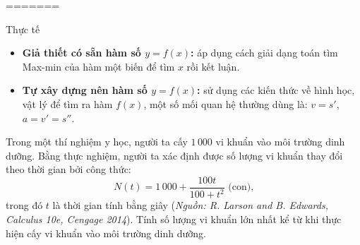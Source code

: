 =======
\begin{dang}{Thực tế}
    \begin{itemize}
        \item \textbf{Giả thiết có sẵn hàm số $y=f(x)$:} áp dụng cách giải dạng toán tìm Max-min của hàm một biến để tìm $x$ rồi kết luận.
        \item \textbf{Tự xây dựng nên hàm số $y=f(x)$:} sử dụng các kiến thức về hình học, vật lý để tìm ra hàm $f(x)$, một số mối quan hệ thường dùng là: $v=s'$, $a=v'=s''$.
    \end{itemize}
\end{dang}
\begin{vd}
    Trong một thí nghiệm y học, người ta cấy $1\,000$ vi khuẩn vào môi trường dinh dưỡng. Bằng thực nghiệm, người ta xác định được số lượng vi khuẩn thay đổi theo thời gian bởi công thức: $$N(t)=1\,000+\dfrac{100t}{100+t^2}\text{ (con),}$$ trong đó $t$ là thời gian tính bằng giây (\textit{Nguồn: R. Larson and B. Edwards, Calculus 10e, Cengage 2014}). Tính số lượng vi khuẩn lớn nhất kể từ khi thực hiện cấy vi khuẩn vào môi trường dinh dưỡng.
\end{vd}
